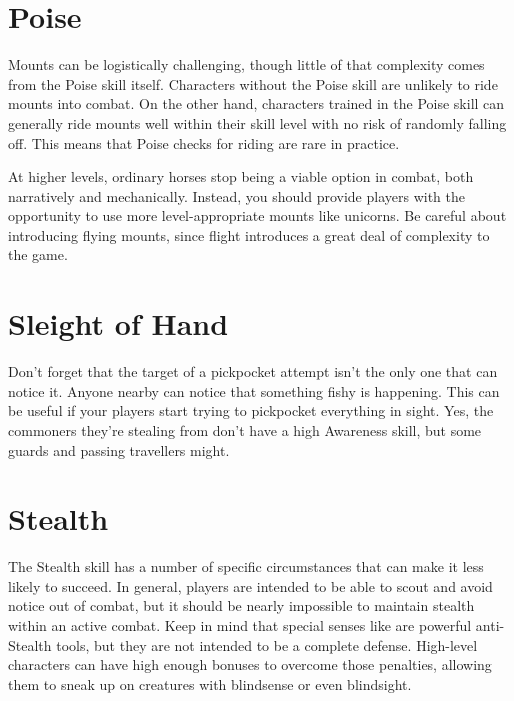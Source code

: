 \section{Poise}
  Mounts can be logistically challenging, though little of that complexity comes from the Poise skill itself.
  Characters without the Poise skill are unlikely to ride mounts into combat.
  On the other hand, characters trained in the Poise skill can generally ride mounts well within their skill level with no risk of randomly falling off.
  This means that Poise checks for riding are rare in practice.

  At higher levels, ordinary horses stop being a viable option in combat, both narratively and mechanically.
  Instead, you should provide players with the opportunity to use more level-appropriate mounts like unicorns.
  Be careful about introducing flying mounts, since flight introduces a great deal of complexity to the game.

\section{Sleight of Hand}
  Don't forget that the target of a pickpocket attempt isn't the only one that can notice it.
  Anyone nearby can notice that something fishy is happening.
  This can be useful if your players start trying to pickpocket everything in sight.
  Yes, the commoners they're stealing from don't have a high Awareness skill, but some guards and passing travellers might.


\section{Stealth}
  The Stealth skill has a number of specific circumstances that can make it less likely to succeed.
  In general, players are intended to be able to scout and avoid notice out of combat, but it should be nearly impossible to maintain stealth within an active combat.
  Keep in mind that special senses like  are powerful anti-Stealth tools, but they are not intended to be a complete defense.
  High-level characters can have high enough bonuses to overcome those penalties, allowing them to sneak up on creatures with blindsense or even blindsight.


